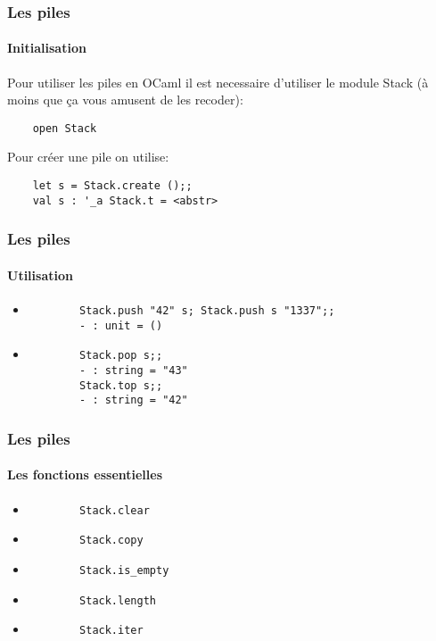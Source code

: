 \begin{frame}[fragile]
\frametitle{Les piles }
\framesubtitle{Initialisation}
	Pour utiliser les piles en OCaml il est necessaire d'utiliser le module Stack (à moins que ça vous amusent de les recoder):
	\begin{lstlisting}
	open Stack
	\end{lstlisting}
	Pour créer une pile on utilise:
	\begin{lstlisting}
	let s = Stack.create ();;
	val s : '_a Stack.t = <abstr>
	\end{lstlisting}
\end{frame}

\begin{frame}[fragile]
\frametitle{Les piles}
\framesubtitle{Utilisation}
	\begin{itemize}
	
	\item
		\begin{lstlisting}
		Stack.push "42" s; Stack.push s "1337";;
		- : unit = ()	
		\end{lstlisting}	
	
	\item
		\begin{lstlisting}
		Stack.pop s;;
		- : string = "43"
		Stack.top s;;
		- : string = "42"
		\end{lstlisting}	

	\end{itemize}


\end{frame}

\begin{frame}[fragile]
\frametitle{Les piles}
\framesubtitle{Les fonctions essentielles}
	\begin{itemize}
	
	\item
		\begin{lstlisting}
		Stack.clear
		\end{lstlisting}

	\item
		\begin{lstlisting}
		Stack.copy
		\end{lstlisting}	

	\item
		\begin{lstlisting}
		Stack.is_empty
		\end{lstlisting}	

	\item
		\begin{lstlisting}
		Stack.length
		\end{lstlisting}	

	\item
		\begin{lstlisting}
		Stack.iter
		\end{lstlisting}

	\end{itemize}

\end{frame}


